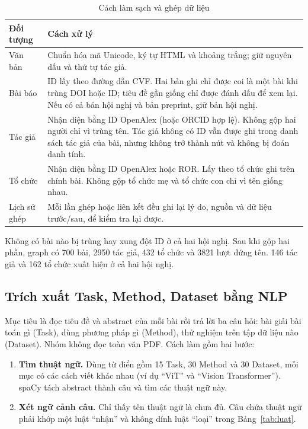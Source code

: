 \documentclass[11pt,a4paper]{article}
\begin{document}
\begin{table}[H]
\small\centering
\renewcommand{\arraystretch}{1.25}
\caption{Cách làm sạch và ghép dữ liệu}
\label{tab:lamsach}
\begin{tabularx}{\textwidth}{@{}>{\raggedright\arraybackslash}p{2.4cm} >{\raggedright\arraybackslash}X@{}}
\toprule
\textbf{Đối tượng} & \textbf{Cách xử lý}\\
\midrule
Văn bản & Chuẩn hóa mã Unicode, ký tự HTML và khoảng trắng; giữ nguyên dấu và thứ tự tác giả.\\
Bài báo & ID lấy theo đường dẫn CVF. Hai bản ghi chỉ được coi là một bài khi trùng DOI hoặc ID; tiêu đề gần giống chỉ được đánh dấu để xem lại. Nếu có cả bản hội nghị và bản preprint, giữ bản hội nghị.\\
Tác giả & Nhận diện bằng ID OpenAlex (hoặc ORCID hợp lệ). Không gộp hai người chỉ vì trùng tên. Tác giả không có ID vẫn được ghi trong danh sách tác giả của bài, nhưng không trở thành nút và không bị đoán danh tính.\\
Tổ chức & Nhận diện bằng ID OpenAlex hoặc ROR. Lấy theo tổ chức ghi trên chính bài. Không gộp tổ chức mẹ và tổ chức con chỉ vì tên giống nhau.\\
Lịch sử ghép & Mỗi lần ghép hoặc liên kết đều ghi lại lý do, nguồn và dữ liệu trước/sau, để kiểm tra lại được.\\
\bottomrule
\end{tabularx}
\end{table}

Không có bài nào bị trùng hay xung đột ID ở cả hai hội nghị. Sau khi gộp hai phần, graph có 700 bài, 2950 tác giả, 432 tổ chức và 3821 lượt đứng tên. 146 tác giả và 162 tổ chức xuất hiện ở cả hai hội nghị.

\subsection{Trích xuất Task, Method, Dataset bằng NLP}\label{sec:nlp}

Mục tiêu là đọc tiêu đề và abstract của mỗi bài rồi trả lời ba câu hỏi: bài giải bài toán gì (Task), dùng phương pháp gì (Method), thử nghiệm trên tập dữ liệu nào (Dataset). Nhóm không đọc toàn văn PDF. Cách làm gồm hai bước:

\begin{enumerate}[leftmargin=1.6em]
  \item \textbf{Tìm thuật ngữ.} Dùng từ điển gồm 15 Task, 30 Method và 30 Dataset, mỗi mục có các cách viết khác nhau (ví dụ ``ViT'' và ``Vision Transformer''). spaCy tách abstract thành câu và tìm các thuật ngữ này.
  \item \textbf{Xét ngữ cảnh câu.} Chỉ thấy tên thuật ngữ là chưa đủ. Câu chứa thuật ngữ phải khớp một luật ``nhận'' và không dính luật ``loại'' trong Bảng~\ref{tab:luat}.
\end{enumerate}
\end{document}
